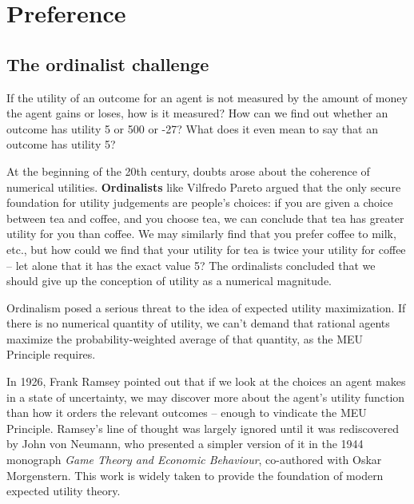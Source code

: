 \chapter{Preference}\label{ch:preference}

%

\section{The ordinalist challenge}

If the utility of an outcome for an agent is not measured by the
amount of money the agent gains or loses, how is it measured? How can
we find out whether an outcome has utility 5 or 500 or -27? What does
it even mean to say that an outcome has utility 5?

At the beginning of the 20th century, doubts arose about the coherence
of numerical utilities. \textbf{Ordinalists} like Vilfredo Pareto
argued that the only secure foundation for utility judgements are
people's choices: if you are given a choice between tea and coffee,
and you choose tea, we can conclude that tea has greater utility for
you than coffee. We may similarly find that you prefer coffee to milk,
etc., but how could we find that your utility for tea is twice your
utility for coffee -- let alone that it has the exact value 5? The
ordinalists concluded that we should give up the conception of utility
as a numerical magnitude.


Ordinalism posed a serious threat to the idea of expected utility
maximization. If there is no numerical quantity of utility, we can't
demand that rational agents maximize the probability-weighted average
of that quantity, as the MEU Principle requires.

In 1926, Frank Ramsey pointed out that if we look at the choices an
agent makes in a state of uncertainty, we may discover more about the
agent's utility function than how it orders the relevant outcomes --
enough to vindicate the MEU Principle. Ramsey's line of thought was
largely ignored until it was rediscovered by John von Neumann, who
presented a simpler version of it in the 1944 monograph \emph{Game
  Theory and Economic Behaviour}, co-authored with Oskar Morgenstern.
This work is widely taken to provide the foundation of modern expected
utility theory.

